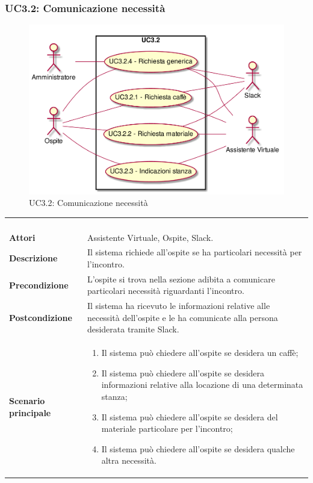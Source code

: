 \subsubsection{UC3.2: Comunicazione necessità}
\label{UC3.2}
\begin{figure}[h]
\centering
\includegraphics[width=\textwidth,height=\textheight,keepaspectratio]{images/UseCaseUC32.png}
\caption{UC3.2: Comunicazione necessità}
\end{figure}
\begin{longtable}{l|p{10cm}}
\rowcolor[gray]{0.8} \multicolumn{2}{c}{} \\
\rowcolor[gray]{0.8} \multicolumn{2}{c}{\textbf{UC3.2 - Comunicazione necessità}} \\
\rowcolor[gray]{0.8} \multicolumn{2}{c}{} \\
\hline
&\\
\textbf{Attori} & Assistente Virtuale, Ospite, Slack.\\[7pt]
\textbf{Descrizione} & Il sistema richiede all'ospite se ha particolari necessità per l'incontro.\\[7pt]
\textbf{Precondizione} & L'ospite si trova nella sezione adibita a comunicare particolari necessità riguardanti l'incontro.\\[7pt]
\textbf{Postcondizione} & Il sistema ha ricevuto le informazioni relative alle necessità dell'ospite e le ha comunicate alla persona desiderata tramite Slack.\\[7pt]
\textbf{Scenario principale} &\begin{enumerate}
\item  Il sistema può chiedere all'ospite se desidera un caffè;
\item  Il sistema può chiedere all'ospite se desidera informazioni relative alla locazione di una determinata stanza;
\item  Il sistema può chiedere all'ospite se desidera del materiale particolare per l'incontro;
\item  Il sistema può chiedere all'ospite se desidera qualche altra necessità.
\end{enumerate}
\\[7pt]\hline
\end{longtable}

